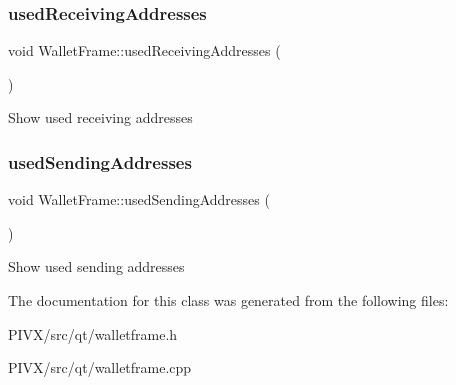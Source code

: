\subsubsection{\texorpdfstring{used\+Receiving\+Addresses}{usedReceivingAddresses}}
{\footnotesize\ttfamily void Wallet\+Frame\+::used\+Receiving\+Addresses (\begin{DoxyParamCaption}{ }\end{DoxyParamCaption})\hspace{0.3cm}{\ttfamily [slot]}}

Show used receiving addresses \mbox{\label{class_wallet_frame_a7f697d220e7ea40d6e4d6e6c5e9ef3b4}} 
\subsubsection{\texorpdfstring{used\+Sending\+Addresses}{usedSendingAddresses}}
{\footnotesize\ttfamily void Wallet\+Frame\+::used\+Sending\+Addresses (\begin{DoxyParamCaption}{ }\end{DoxyParamCaption})\hspace{0.3cm}{\ttfamily [slot]}}

Show used sending addresses 

The documentation for this class was generated from the following files\+:\begin{DoxyCompactItemize}
\item 
P\+I\+V\+X/src/qt/walletframe.\+h\item 
P\+I\+V\+X/src/qt/walletframe.\+cpp\end{DoxyCompactItemize}
